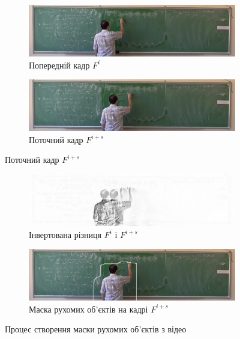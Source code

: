 \begin{figure}[H]
	\centering
	\begin{subfigure}[b]{0.55\textwidth}
		\centering
		\includegraphics[width=\textwidth]{images/prev_frame}
		\caption{Попередній кадр $F^i$
			\label{fig:yakovlev:bk_examples:a}
		}
	\end{subfigure}
	
	\begin{subfigure}[b]{0.55\textwidth}
		\centering
		\includegraphics[width=\textwidth]{images/next_frame}
		\caption{Поточний кадр $F^{i+s}$
			\label{fig:yakovlev:bk_examples:b}
		}
	\end{subfigure}
\end{figure}
\begin{figure}[H]
	\centering
	\ContinuedFloat
	\begin{subfigure}[b]{0.55\textwidth}
		\centering
		\includegraphics[width=\textwidth]{images/inv_diff}
		\caption{Інвертована різниця $F^i$ і $F^{i+s}$
			\label{fig:yakovlev:bk_examples:c}
		}
	\end{subfigure}
	
	\begin{subfigure}[b]{0.55\textwidth}
		\centering
		\includegraphics[width=\textwidth]{images/next_with_mask}
		\caption{Маска рухомих об'єктів на кадрі $F^{i+s}$
			\label{fig:yakovlev:bk_examples:d}
		}
	\end{subfigure}
	
	\caption{Процес створення маски рухомих об'єктів з відео \cite{yakovlev_video}
		\label{fig:yakovlev:bk_examples}
	}
\end{figure}


